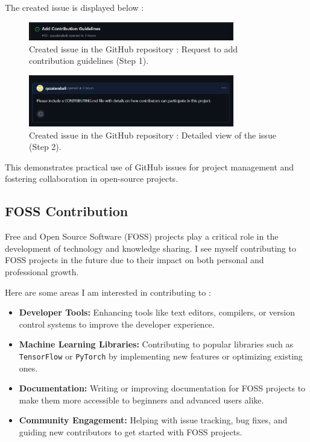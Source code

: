 \documentclass[12pt]{article}
\begin{document}
            The created issue is displayed below :

            \begin{figure}[H]
                \centering
                \includegraphics[width=0.8\textwidth]{assets/pictures/Requestـtoـaddـcontributionـguidelines.png}
                \caption{Created issue in the GitHub repository : Request to add contribution guidelines (Step 1).}
            \end{figure}

            \begin{figure}[H]
                \centering
                \includegraphics[width=0.8\textwidth]{assets/pictures/Detailedـviewـofـtheـissue.png}
                \caption{Created issue in the GitHub repository : Detailed view of the issue (Step 2).}
            \end{figure}

            This demonstrates practical use of GitHub issues for project management and fostering collaboration in open-source projects.

        \subsection{FOSS Contribution}

            Free and Open Source Software (FOSS) projects play a critical role in the development of technology and knowledge sharing. I see myself contributing to FOSS projects in the future due to their impact on both personal and professional growth. 
            
            Here are some areas I am interested in contributing to :
            \begin{itemize}
                \item \textbf{Developer Tools:} Enhancing tools like text editors, compilers, or version control systems to improve the developer experience.
                \item \textbf{Machine Learning Libraries:} Contributing to popular libraries such as \texttt{TensorFlow} or \texttt{PyTorch} by implementing new features or optimizing existing ones.
                \item \textbf{Documentation:} Writing or improving documentation for FOSS projects to make them more accessible to beginners and advanced users alike.
                \item \textbf{Community Engagement:} Helping with issue tracking, bug fixes, and guiding new contributors to get started with FOSS projects.
            \end{itemize}
            
\end{document}
